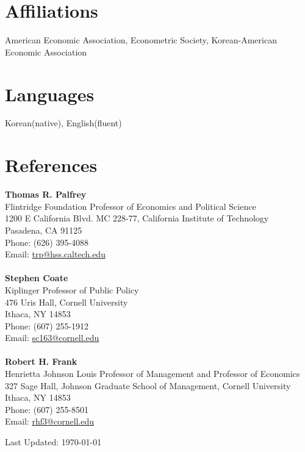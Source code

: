 \documentclass[margin]{res}
\begin{document}
\begin{resume}
\section{Affiliations} American Economic Association, Econometric Society, Korean-American Economic Association

\section{Languages} Korean(native), English(fluent)

\section{References} \textbf{Thomas R. Palfrey}\\
Flintridge Foundation Professor of Economics and Political Science\\
1200 E California Blvd. MC 228-77, California Institute of Technology\\
Pasadena, CA 91125\\
Phone: (626) 395-4088\\
Email: \href{mailto:trp@hss.caltech.edu}{trp@hss.caltech.edu}\\\\%
\textbf{Stephen Coate}\\
Kiplinger Professor of Public Policy\\
476 Uris Hall, Cornell University\\
Ithaca, NY 14853\\
Phone: (607) 255-1912 \\
Email: \href{mailto:sc163@cornell.edu}{sc163@cornell.edu}\\\\
\textbf{Robert H. Frank}\\
Henrietta Johnson Louis Professor of Management and Professor of Economics\\
327 Sage Hall, Johnson Graduate School of Management, Cornell University\\
Ithaca, NY 14853\\
Phone: (607) 255-8501\\
Email: \href{mailto:rhf3@cornell.edu}{rhf3@cornell.edu}
\begin{flushright}
Last Updated: \today
\end{flushright}
\end{resume} 
\end{document}
